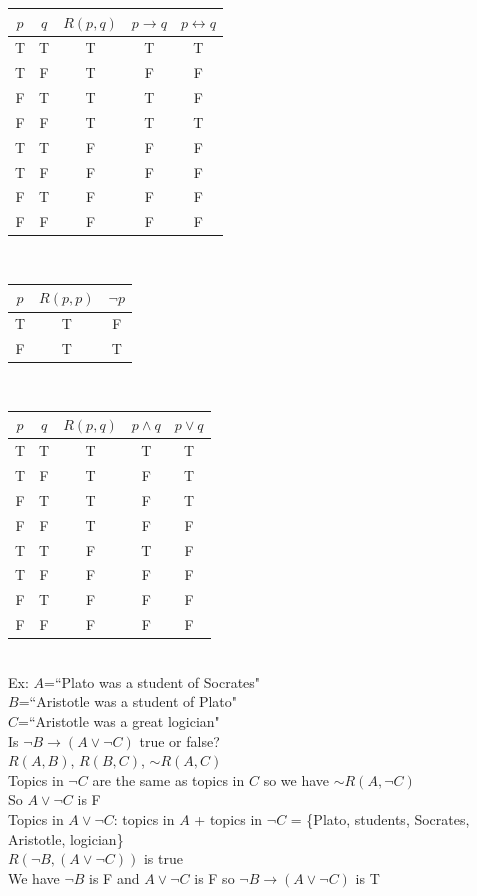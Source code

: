 \begin{tabular}{ccccc}
    $p$ & $q$ & $R(p,q)$ & $p\to q$ & $p\leftrightarrow q$\\
    \hline
    T & T & T & T & T\\
    T & F & T & F & F\\
    F & T & T & T & F\\
    F & F & T & T & T\\
    T & T & F & F & F\\
    T & F & F & F & F\\
    F & T & F & F & F\\
    F & F & F & F & F
\end{tabular}\\
\begin{tabular}{ccc}
    $p$ & $R(p,p)$ & $\lnot p$\\
    \hline
    T & T & F\\
    F & T & T
\end{tabular}\\
\begin{tabular}{ccccc}
    $p$ & $q$ & $R(p,q)$ & $p\wedge q$ & $p\vee q$\\
    \hline
    T & T & T & T & T\\
    T & F & T & F & T\\
    F & T & T & F & T\\
    F & F & T & F & F\\
    T & T & F & T & F\\
    T & F & F & F & F\\
    F & T & F & F & F\\
    F & F & F & F & F
\end{tabular}\\
Ex: $A$=``Plato was a student of Socrates"\\
$B$=``Aristotle was a student of Plato"\\
$C$=``Aristotle was a great logician"\\
Is $\lnot B\to(A\vee \lnot C)$ true or false?\\
$R(A,B)$, $R(B,C)$, $\sim R(A,C)$\\
Topics in $\lnot C$ are the same as topics in $C$ so we have $\sim R(A,\lnot C)$\\
So $A\vee \lnot C$ is F\\
Topics in $A\vee \lnot C$: topics in $A$ + topics in $\lnot C$ = \{Plato, students, Socrates, Aristotle, logician\}\\
$R(\lnot B,(A\vee\lnot C))$ is true\\
We have $\lnot B$ is F and $A\vee\lnot C$ is F so $\lnot B\to(A\vee\lnot C)$ is T\\

